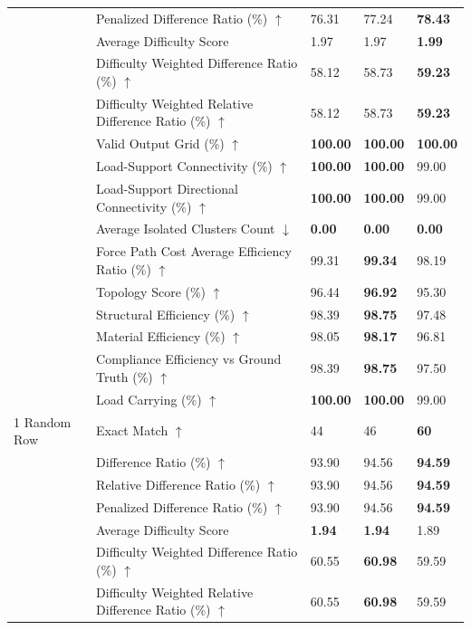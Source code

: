 \begin{table}[!h]
{\begin{tabular}{lllll}
 & Penalized Difference Ratio (\%) $\uparrow$ & 76.31 & 77.24 & \textbf{78.43} \\
 & Average Difficulty Score & 1.97 & 1.97 & \textbf{1.99} \\
 & Difficulty Weighted Difference Ratio (\%) $\uparrow$ & 58.12 & 58.73 & \textbf{59.23} \\
 & Difficulty Weighted Relative Difference Ratio (\%) $\uparrow$ & 58.12 & 58.73 & \textbf{59.23} \\
 & Valid Output Grid (\%) $\uparrow$ & \textbf{100.00} & \textbf{100.00} & \textbf{100.00} \\
 & Load-Support Connectivity (\%) $\uparrow$ & \textbf{100.00} & \textbf{100.00} & 99.00 \\
 & Load-Support Directional Connectivity (\%) $\uparrow$ & \textbf{100.00} & \textbf{100.00} & 99.00 \\
 & Average Isolated Clusters Count $\downarrow$ & \textbf{0.00} & \textbf{0.00} & \textbf{0.00} \\
 & Force Path Cost Average Efficiency Ratio (\%) $\uparrow$ & 99.31 & \textbf{99.34} & 98.19 \\
 & Topology Score (\%) $\uparrow$ & 96.44 & \textbf{96.92} & 95.30 \\
 & Structural Efficiency (\%) $\uparrow$ & 98.39 & \textbf{98.75} & 97.48 \\
 & Material Efficiency (\%) $\uparrow$ & 98.05 & \textbf{98.17} & 96.81 \\
 & Compliance Efficiency vs Ground Truth (\%) $\uparrow$ & 98.39 & \textbf{98.75} & 97.50 \\
 & Load Carrying (\%) $\uparrow$ & \textbf{100.00} & \textbf{100.00} & 99.00 \\
1 Random Row & Exact Match $\uparrow$ & 44 & 46 & \textbf{60} \\
 & Difference Ratio (\%) $\uparrow$ & 93.90 & 94.56 & \textbf{94.59} \\
 & Relative Difference Ratio (\%) $\uparrow$ & 93.90 & 94.56 & \textbf{94.59} \\
 & Penalized Difference Ratio (\%) $\uparrow$ & 93.90 & 94.56 & \textbf{94.59} \\
 & Average Difficulty Score & \textbf{1.94} & \textbf{1.94} & 1.89 \\
 & Difficulty Weighted Difference Ratio (\%) $\uparrow$ & 60.55 & \textbf{60.98} & 59.59 \\
 & Difficulty Weighted Relative Difference Ratio (\%) $\uparrow$ & 60.55 & \textbf{60.98} & 59.59 \\

\end{tabular}}
\end{table}
